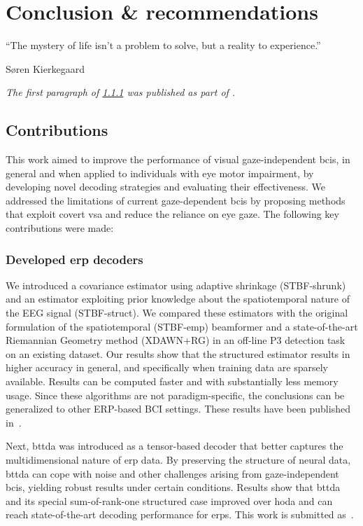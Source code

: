 \chapter{Conclusion \& recommendations}
\epigraph{``The mystery of life isn't a problem to solve, but a reality to
experience.''}{S{\o}ren Kierkegaard}
\noindent\emph{The first paragraph of \cref{sec:conclusion/contrib/decoders} was published as
part of \textcite{VanDenKerchove2022}.}


\section{Contributions}

This work aimed to improve the performance of visual gaze-independent \acsp{bci}, in general
and when applied to individuals with eye motor impairment, by developing novel decoding
strategies and evaluating their effectiveness.
We addressed the limitations of current gaze-dependent \acp{bci} by proposing methods that
exploit covert \ac{vsa} and reduce the reliance on eye gaze.
The following key contributions were made:

\subsection{Developed \acs{erp} decoders}
\label{sec:conclusion/contrib/decoders}
We introduced a covariance estimator using adaptive shrinkage (STBF-shrunk) and an estimator
exploiting prior knowledge about the spatiotemporal nature of the EEG signal
(STBF-struct).
We compared these estimators with the original formulation of the
spatiotemporal (STBF-emp)
beamformer and a state-of-the-art Riemannian Geometry method (XDAWN+RG) in an off-line P3 detection task on
an existing dataset.
Our results show that the structured estimator results in higher
accuracy in
general, and specifically when training data are sparsely available.
Results can be computed faster and with
substantially less memory usage.
Since these algorithms are not paradigm-specific, the conclusions can be
generalized to other ERP-based BCI settings.
These results have been published in~\textcite{VanDenKerchove2022}.

Next, \acf{bttda} was introduced as a tensor-based decoder that better captures the
multidimensional nature of \ac{erp} data.
By preserving the structure of neural data, \ac{bttda} can cope with noise and other challenges
arising from gaze-independent \acp{bci}, yielding robust results under certain conditions.
Results show that \ac{bttda} and its special sum-of-rank-one structured case
improved over \ac{hoda} and can reach state-of-the-art decoding performance for
\acp{erp}.
This work is submitted as~\textcite{VanDenKerchove2024a}.

